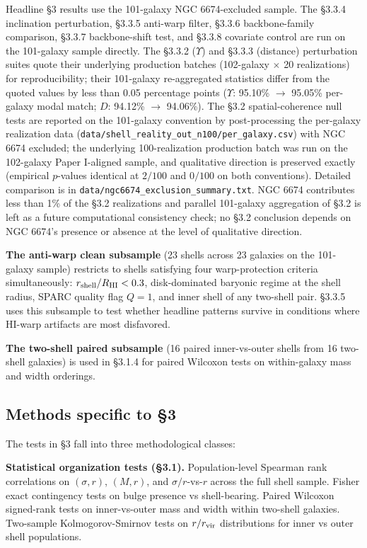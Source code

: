 \documentclass[linenumbers,trackchanges]{aastex701}
\begin{document}
Headline \S3 results use the 101-galaxy NGC 6674-excluded sample. The \S3.3.4 inclination perturbation, \S3.3.5 anti-warp filter, \S3.3.6 backbone-family comparison, \S3.3.7 backbone-shift test, and \S3.3.8 covariate control are run on the 101-galaxy sample directly. The \S3.3.2 ($\Upsilon$) and \S3.3.3 (distance) perturbation suites quote their underlying production batches (102-galaxy $\times$ 20 realizations) for reproducibility; their 101-galaxy re-aggregated statistics differ from the quoted values by less than 0.05 percentage points ($\Upsilon$: 95.10\% $\rightarrow$ 95.05\% per-galaxy modal match; $D$: 94.12\% $\rightarrow$ 94.06\%). The \S3.2 spatial-coherence null tests are reported on the 101-galaxy convention by post-processing the per-galaxy realization data (\texttt{data/shell\_reality\_out\_n100/per\_galaxy.csv}) with NGC 6674 excluded; the underlying 100-realization production batch was run on the 102-galaxy Paper I-aligned sample, and qualitative direction is preserved exactly (empirical $p$-values identical at $2/100$ and $0/100$ on both conventions). Detailed comparison is in \texttt{data/ngc6674\_exclusion\_summary.txt}. NGC 6674 contributes less than 1\% of the \S3.2 realizations and parallel 101-galaxy aggregation of \S3.2 is left as a future computational consistency check; no \S3.2 conclusion depends on NGC 6674's presence or absence at the level of qualitative direction.

\textbf{The anti-warp clean subsample} (23 shells across 23 galaxies on the 101-galaxy sample) restricts to shells satisfying four warp-protection criteria simultaneously: $r_{\rm shell}/R_{\rm HI} < 0.3$, disk-dominated baryonic regime at the shell radius, SPARC quality flag $Q = 1$, and inner shell of any two-shell pair. \S3.3.5 uses this subsample to test whether headline patterns survive in conditions where HI-warp artifacts are most disfavored.

\textbf{The two-shell paired subsample} (16 paired inner-vs-outer shells from 16 two-shell galaxies) is used in \S3.1.4 for paired Wilcoxon tests on within-galaxy mass and width orderings.

\subsection{Methods specific to \S3}

The tests in \S3 fall into three methodological classes:

\textbf{Statistical organization tests (\S3.1).} Population-level Spearman rank correlations on $(\sigma, r)$, $(M, r)$, and $\sigma/r$-vs-$r$ across the full shell sample. Fisher exact contingency tests on bulge presence vs shell-bearing. Paired Wilcoxon signed-rank tests on inner-vs-outer mass and width within two-shell galaxies. Two-sample Kolmogorov-Smirnov tests on $r/r_{\rm vir}$ distributions for inner vs outer shell populations.
\end{document}
